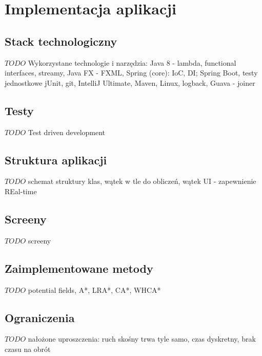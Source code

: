 \chapter{Implementacja aplikacji}
\label{ch:implementation}

\section{Stack technologiczny}
$TODO$ Wykorzystane technologie i narzędzia:
Java 8 - lambda, functional interfaces, streamy,
Java FX - FXML, Spring (core): IoC, DI; Spring Boot, testy jednostkowe jUnit, git, IntelliJ Ultimate, Maven, Linux, logback, Guava - joiner

\section{Testy}
$TODO$ Test driven development

\section{Struktura aplikacji}
$TODO$ schemat struktury klas, wątek w tle do obliczeń, wątek UI - zapewnienie REal-time

\section{Screeny}
$TODO$ screeny

\section{Zaimplementowane metody}
$TODO$ potential fields, A*, LRA*, CA*, WHCA*

\section{Ograniczenia}
$TODO$ nałożone uproszczenia: ruch skośny trwa tyle samo, czas dyskretny, brak czasu na obrót